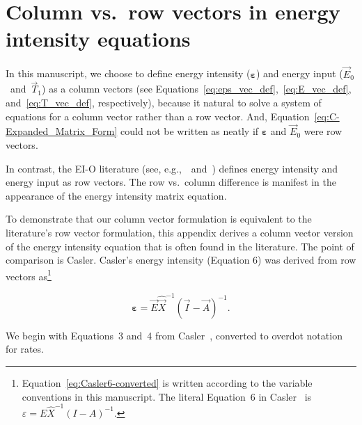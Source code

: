 %
%
%
\chapter{Column vs.\ row vectors in energy intensity equations}
\label{chap:Casler} 


In this manuscript, we choose to define 
energy intensity ($\boldsymbol{\varepsilon}$) and 
energy input ($\vec{E}_{0}$~and~$\vec{T}_{1}$)
as a column vectors (see Equations~\ref{eq:eps_vec_def},~\ref{eq:E_vec_def}, 
and~\ref{eq:T_vec_def}, respectively),
because it natural to solve a system of equations
for a column vector rather than a row vector.
And, Equation~\ref{eq:C-Expanded_Matrix_Form} could not
be written as neatly if $\boldsymbol{\varepsilon}$ and $\vec{E}_{0}$
were row vectors.

In contrast, the EI-O literature (see, 
e.g.,~\cite{Casler1984}~and~\cite{Bullard:1978vd})
defines energy intensity and energy input
as row vectors. 
The row vs.\ column difference is manifest in the appearance 
of the energy intensity matrix equation.

To demonstrate that our column vector formulation is equivalent 
to the literature's row vector formulation,
this appendix derives a column vector version of the energy intensity equation
that is often found in the literature.
The point of comparison is Casler.\cite{Casler1984}
Casler's energy intensity (Equation 6)
was derived from row vectors 
as\footnote{Equation~\ref{eq:Casler6-converted} is written according
to the variable conventions in this manuscript.
The literal Equation~6 in Casler~\cite{Casler1984} is
$
\varepsilon
= E \hat{X}^{-1} {(I - A)}^{-1}.
$
}

\begin{equation} \label{eq:Casler6-converted}
	\boldsymbol{\varepsilon}
	= \vec{E} 
		\hat{\vec{X}}^{-1}
		{(\vec{I} - \vec{A})}^{-1}.
\end{equation}

We begin with Equations~3 and~4 from Casler~\cite{Casler1984},
converted to overdot notation for rates.

